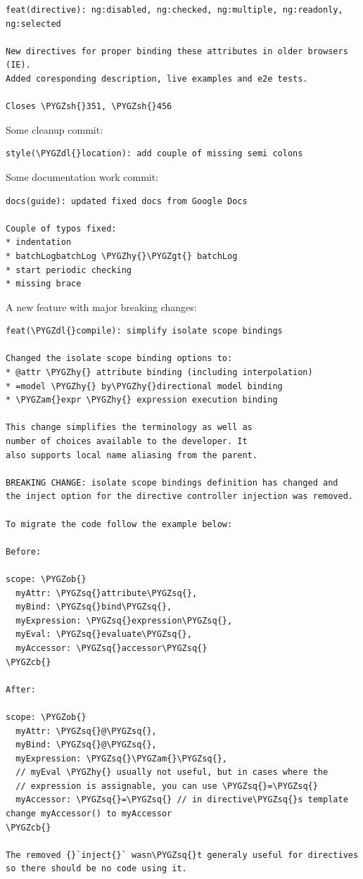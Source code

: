 \documentclass[letterpaper,10pt,english]{sphinxmanual}
\def\PYGZob{\char`\{}
\def\PYGZcb{\char`\}}
\def\PYGZam{\char`\&}
\def\PYGZgt{\char`\>}
\def\PYGZsh{\char`\#}
\def\PYGZdl{\char`\$}
\def\PYGZhy{\char`\-}
\def\PYGZsq{\char`\'}
\renewcommand\PYGZsq{\textquotesingle}
\begin{document}
\begin{Verbatim}[commandchars=\\\{\}]
feat(directive): ng:disabled, ng:checked, ng:multiple, ng:readonly, ng:selected

New directives for proper binding these attributes in older browsers (IE).
Added coresponding description, live examples and e2e tests.

Closes \PYGZsh{}351, \PYGZsh{}456
\end{Verbatim}

Some cleanup commit:

\begin{Verbatim}[commandchars=\\\{\}]
style(\PYGZdl{}location): add couple of missing semi colons
\end{Verbatim}

Some documentation work commit:

\begin{Verbatim}[commandchars=\\\{\}]
docs(guide): updated fixed docs from Google Docs

Couple of typos fixed:
* indentation
* batchLogbatchLog \PYGZhy{}\PYGZgt{} batchLog
* start periodic checking
* missing brace
\end{Verbatim}

A new feature with major breaking changes:

\begin{Verbatim}[commandchars=\\\{\}]
feat(\PYGZdl{}compile): simplify isolate scope bindings

Changed the isolate scope binding options to:
* @attr \PYGZhy{} attribute binding (including interpolation)
* =model \PYGZhy{} by\PYGZhy{}directional model binding
* \PYGZam{}expr \PYGZhy{} expression execution binding

This change simplifies the terminology as well as
number of choices available to the developer. It
also supports local name aliasing from the parent.

BREAKING CHANGE: isolate scope bindings definition has changed and
the inject option for the directive controller injection was removed.

To migrate the code follow the example below:

Before:

scope: \PYGZob{}
  myAttr: \PYGZsq{}attribute\PYGZsq{},
  myBind: \PYGZsq{}bind\PYGZsq{},
  myExpression: \PYGZsq{}expression\PYGZsq{},
  myEval: \PYGZsq{}evaluate\PYGZsq{},
  myAccessor: \PYGZsq{}accessor\PYGZsq{}
\PYGZcb{}

After:

scope: \PYGZob{}
  myAttr: \PYGZsq{}@\PYGZsq{},
  myBind: \PYGZsq{}@\PYGZsq{},
  myExpression: \PYGZsq{}\PYGZam{}\PYGZsq{},
  // myEval \PYGZhy{} usually not useful, but in cases where the
  // expression is assignable, you can use \PYGZsq{}=\PYGZsq{}
  myAccessor: \PYGZsq{}=\PYGZsq{} // in directive\PYGZsq{}s template change myAccessor() to myAccessor
\PYGZcb{}

The removed {}`inject{}` wasn\PYGZsq{}t generaly useful for directives so there should be no code using it.
\end{Verbatim}
\end{document}
